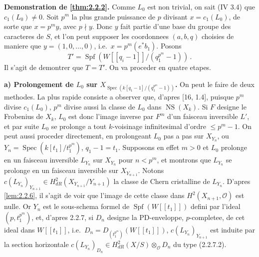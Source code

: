 \documentclass[12pt,a4paper]{article}
\theoremstyle{plain}
\theoremstyle{definition}
\theoremstyle{remark}
\DeclareMathOperator{\Spf}{Spf}
\DeclareMathOperator{\Spec}{Spec}
\DeclareMathOperator{\NS}{NS}
\begin{document}
\subsubsection{}

\textbf{Demonstration de \ref{thm:2.2.2}.} Comme $L_0$ est non trivial, on sait (IV 3.4) que $c_1(L_0) \neq 0$. Soit $p^m$ la plus grande puissance de $p$ divisant $x = c_1(L_0)$, de sorte que $x = p^my$, avec $p \nmid y$. Donc $y$ fait partie d'une base du groupe des caracteres de $S$, et l'on peut supposer les coordonnees $(a, b, q)$ choisies de maniere que $y = (1, 0, \ldots, 0)$, i.e.\ $x = p^m(e^*b_1)$. Posons
\[
T' = \Spf(W[[q_i - 1]]/(q_1^{p^m} - 1))\,.\]
Il s'agit de demontrer que $T = T'$. On va proceder en quatre etapes.

\textbf{a) Prolongement de $L_0$ sur $X_{\Spec(k[q_1-1]/(q_1^{p^m}-1))}$.} On peut le faire de deux methodes. La plus rapide consiste a observer que, d'apres [16, 1.4], puisque $p^m$ divise $c_1(L_0)$, $p^m$ divise aussi la classe de $L_0$ dans $\NS(X_k)$. Si $F$ designe le Frobenius de $X_k$, $L_0$ est donc l'image inverse par $F^m$ d'un faisceau inversible $L'$, et par suite $L_0$ se prolonge a tout $k$-voisinage infinitesimal d'ordre $\leq p^m - 1$. On peut aussi proceder directement, en prolongeant $L_0$ pas a pas sur $X_{Y_n}$, ou $Y_n = \Spec(k[t_1]/t_1^{p^m})$, $q_1 - 1 = t_1$. Supposons en effet $m > 0$ et $L_0$ prolonge en un faisceau inversible $L_{Y_n}$ sur $X_{Y_n}$ pour $n < p^m$, et montrons que $L_{Y_n}$ se prolonge en un faisceau inversible sur $X_{Y_{n+1}}$. Notons $c(L_{Y_n})_{Y_{n+1}} \in H_{dR}^2(X_{Y_{n+1}}/Y_{n+1})$ la classe de Chern cristalline de $L_{Y_n}$. D'apres \ref{lem:2.2.6}, il s'agit de voir que l'image de cette classe dans $H^2(X_{n+1}, \mathcal{O})$ est nulle. Or $Y_n$ est le sous-schema formel de $\Spf(W[[t_1]])$ defini par l'ideal $(p, t_1^{p^m})$, et, d'apres 2.2.7, si $D_n$ designe la PD-enveloppe, $p$-completee, de cet ideal dans $W[[t_1]]$, i.e.\ $D_n = D_{(t_1^{p^m})}(W[[t_1]])$, $c(L_{Y_n})_{Y_{n+1}}$ est induite par la section horizontale $c(L_{Y_n})_{D_n} \in H_{dR}^2(X/S) \otimes_\mathcal{O} D_n$ du type (2.2.7.2).
\end{document}

